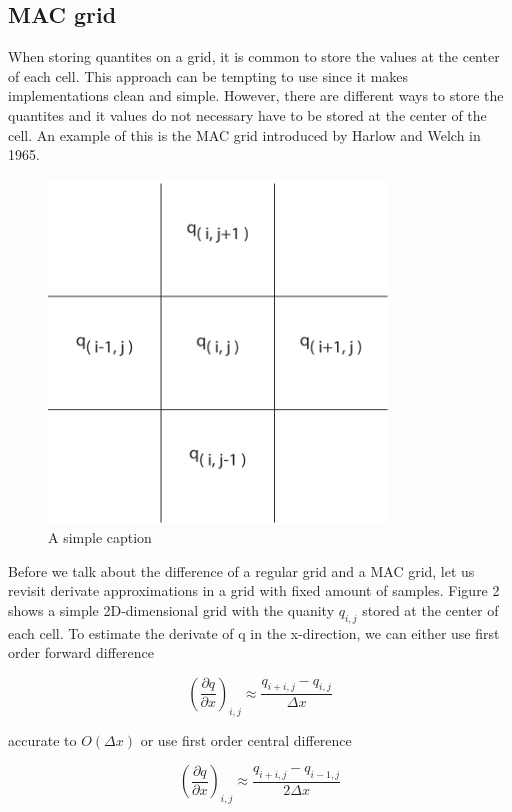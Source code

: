 \subsection{MAC grid}

When storing quantites on a grid, it is common to store the values at the center of each cell. This approach can be tempting to use since it makes implementations clean and simple. However, there are different ways to store the quantites and it values do not necessary have to be stored at the center of the cell. An example of this is the MAC grid introduced by Harlow and Welch in 1965.

\begin{figure}[ht!]
\centering
\includegraphics[width=90mm]{img/mac.pdf}
\caption{A simple caption}
\label{regulargrid}
\end{figure}

Before we talk about the difference of a regular grid and a MAC grid, let us revisit derivate approximations in a grid with fixed amount of samples. Figure 2 shows a simple 2D-dimensional grid with the quanity $q_{i,j}$ stored at the center of each cell. To estimate the derivate of q in the x-direction, we can either use first order forward difference 

\begin{equation}
(\frac{\partial q}{\partial x})_{i,j} \approx \frac{q_{i+i,j} - q_{i,j}}{\Delta x}
\end{equation}

accurate to $O(\Delta x)$ or use first order central difference

\begin{equation}
(\frac{\partial q}{\partial x})_{i,j} \approx \frac{q_{i+i,j} - q_{i-1,j}}{2\Delta x}
\label{centraldifference}
\end{equation}

